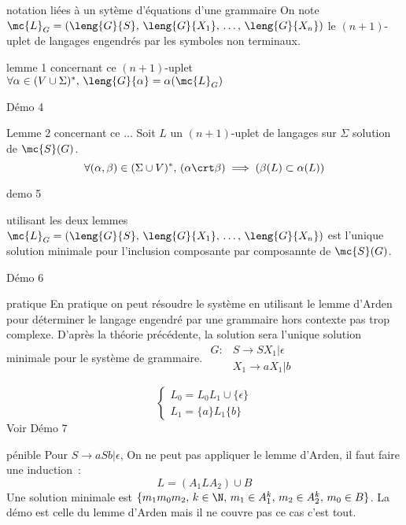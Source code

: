 \begin{adjustwidth}{-3cm}{-3cm}
\begin{remarque}{}{notation liées à un sytème d'équations d'une grammaire}
    On note $\mc{L}_G = (\leng{G}{S},\, \leng{G}{X_1},\,\dots,\,  \leng{G}{X_n})$ le $(n+1)$-uplet de langages engendrés par les symboles non terminaux.
\end{remarque}

\begin{proposition}{}{lemme 1 concernant ce $(n+1)$-uplet}
    $\forall \alpha \in (V \cup \Sigma)^*,\, \leng{G}{\alpha} = \alpha(\mc{L}_G)$
\end{proposition}
Démo 4

\begin{proposition}{}{Lemme 2 concernant ce ...}
    Soit $L$ un $(n+1)$-uplet de langages sur $\Sigma$ solution de $\mc{S}(G)$.\\
    $$\forall (\alpha,\beta) \in (\Sigma \cup V)^*,\, (\alpha \crt \beta) \implies (\beta(L) \subset \alpha(L))$$
\end{proposition}
demo 5

\begin{theoreme}{}{utilisant les deux lemmes}
    $\mc{L}_G = (\leng{G}{S},\, \leng{G}{X_1},\,\dots,\,  \leng{G}{X_n})$  est l'unique solution minimale pour l'inclusion composante par composannte de $\mc{S}(G)$.
\end{theoreme}
Démo 6

\begin{exemple}{}{pratique}
    En pratique on peut résoudre le système en utilisant le lemme d'Arden pour déterminer le langage engendré par une grammaire hors contexte pas trop complexe. D'après la théorie précédente, la solution sera l'unique solution minimale pour le système de grammaire.
    $\begin{align*}
        G : &S \rightarrow  SX_1 \vert \epsilon\\
        &X_1 \rightarrow aX_1 \vert b 
    \end{align*}$

    $$\begin{cases*}
        L_0 = L_0L_1 \cup \{\epsilon\}\\
        L_1 = \{a\}L_1\{b\}
    \end{cases*}$$
    Voir Démo 7
\end{exemple}

\begin{exemple}{}{pénible}
    Pour $S\rightarrow aSb \vert \epsilon$,
    On ne peut pas appliquer le lemme d'Arden, il faut faire une induction~:
    $$L = (A_1LA_2) \cup B$$
    Une solution minimale est $\{m_1 m_0 m_2,\, k \in \N,\, m_1 \in A_1^k,\, m_2 \in A_2^k,\, m_0 \in B\}$. La démo est celle du lemme d'Arden mais il ne couvre pas ce cas c'est tout.
\end{exemple}


\end{adjustwidth}
